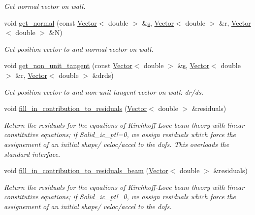 \begin{DoxyCompactItemize}
\begin{DoxyCompactList}\small\item\em Get normal vector on wall. \end{DoxyCompactList}\item 
void \hyperlink{classoomph_1_1KirchhoffLoveBeamEquations_a22ac8fb781bc845fa0dc3a77e1127d08}{get\+\_\+normal} (const \hyperlink{classoomph_1_1Vector}{Vector}$<$ double $>$ \&\hyperlink{cfortran_8h_ab7123126e4885ef647dd9c6e3807a21c}{s}, \hyperlink{classoomph_1_1Vector}{Vector}$<$ double $>$ \&r, \hyperlink{classoomph_1_1Vector}{Vector}$<$ double $>$ \&N)
\begin{DoxyCompactList}\small\item\em Get position vector to and normal vector on wall. \end{DoxyCompactList}\item 
void \hyperlink{classoomph_1_1KirchhoffLoveBeamEquations_a73584a8199a342faf924def94245bdfd}{get\+\_\+non\+\_\+unit\+\_\+tangent} (const \hyperlink{classoomph_1_1Vector}{Vector}$<$ double $>$ \&\hyperlink{cfortran_8h_ab7123126e4885ef647dd9c6e3807a21c}{s}, \hyperlink{classoomph_1_1Vector}{Vector}$<$ double $>$ \&r, \hyperlink{classoomph_1_1Vector}{Vector}$<$ double $>$ \&drds)
\begin{DoxyCompactList}\small\item\em Get position vector to and non-\/unit tangent vector on wall\+: dr/ds. \end{DoxyCompactList}\item 
void \hyperlink{classoomph_1_1KirchhoffLoveBeamEquations_a1b1d654d07a38349b99380cabac33808}{fill\+\_\+in\+\_\+contribution\+\_\+to\+\_\+residuals} (\hyperlink{classoomph_1_1Vector}{Vector}$<$ double $>$ \&residuals)
\begin{DoxyCompactList}\small\item\em Return the residuals for the equations of Kirchhoff-\/\+Love beam theory with linear constitutive equations; if Solid\+\_\+ic\+\_\+pt!=0, we assign residuals which force the assignement of an initial shape/ veloc/accel to the dofs. This overloads the standard interface. \end{DoxyCompactList}\item 
void \hyperlink{classoomph_1_1KirchhoffLoveBeamEquations_a50800b61dd7036d13a9213388b7957c9}{fill\+\_\+in\+\_\+contribution\+\_\+to\+\_\+residuals\+\_\+beam} (\hyperlink{classoomph_1_1Vector}{Vector}$<$ double $>$ \&residuals)
\begin{DoxyCompactList}\small\item\em Return the residuals for the equations of Kirchhoff-\/\+Love beam theory with linear constitutive equations; if Solid\+\_\+ic\+\_\+pt!=0, we assign residuals which force the assignement of an initial shape/ veloc/accel to the dofs. \end{DoxyCompactList}\item 

\end{DoxyCompactItemize}
